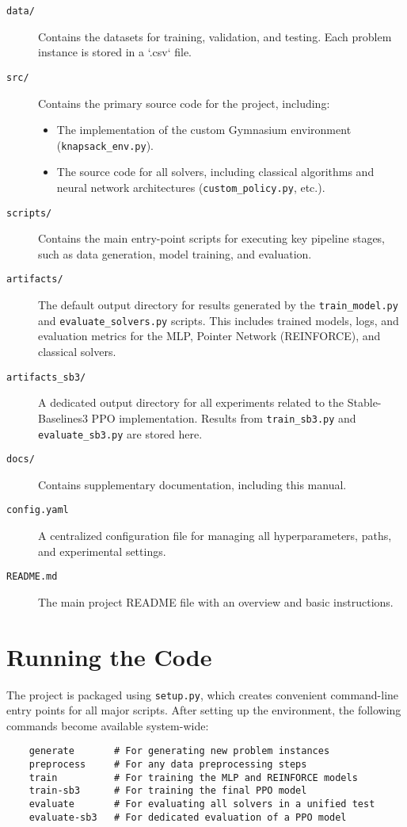 \begin{description}
    \item[\texttt{data/}] Contains the datasets for training, validation, and testing. Each problem instance is stored in a `.csv` file.
    \item[\texttt{src/}] Contains the primary source code for the project, including:
        \begin{itemize}
            \item The implementation of the custom Gymnasium environment (\texttt{knapsack\_env.py}).
            \item The source code for all solvers, including classical algorithms and neural network architectures (\texttt{custom\_policy.py}, etc.).
        \end{itemize}
    \item[\texttt{scripts/}] Contains the main entry-point scripts for executing key pipeline stages, such as data generation, model training, and evaluation.
    \item[\texttt{artifacts/}] The default output directory for results generated by the \texttt{train\_model.py} and \texttt{evaluate\_solvers.py} scripts. This includes trained models, logs, and evaluation metrics for the MLP, Pointer Network (REINFORCE), and classical solvers.
    \item[\texttt{artifacts\_sb3/}] A dedicated output directory for all experiments related to the Stable-Baselines3 PPO implementation. Results from \texttt{train\_sb3.py} and \texttt{evaluate\_sb3.py} are stored here.
    \item[\texttt{docs/}] Contains supplementary documentation, including this manual.
    \item[\texttt{config.yaml}] A centralized configuration file for managing all hyperparameters, paths, and experimental settings.
    \item[\texttt{README.md}] The main project README file with an overview and basic instructions.
\end{description}

\section{Running the Code}
The project is packaged using \texttt{setup.py}, which creates convenient command-line entry points for all major scripts. After setting up the environment, the following commands become available system-wide:

\begin{verbatim}
    generate       # For generating new problem instances
    preprocess     # For any data preprocessing steps
    train          # For training the MLP and REINFORCE models
    train-sb3      # For training the final PPO model
    evaluate       # For evaluating all solvers in a unified test
    evaluate-sb3   # For dedicated evaluation of a PPO model
\end{verbatim}

